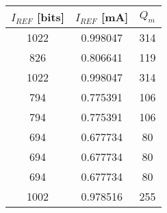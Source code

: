 \begin{tabular}{ccc}
\toprule
$I_{REF}$ [bits] & $I_{REF}$ [mA] & $Q_m$ \\
\midrule
            1022 &       0.998047 &   314 \\
             826 &       0.806641 &   119 \\
            1022 &       0.998047 &   314 \\
             794 &       0.775391 &   106 \\
             794 &       0.775391 &   106 \\
             694 &       0.677734 &    80 \\
             694 &       0.677734 &    80 \\
             694 &       0.677734 &    80 \\
            1002 &       0.978516 &   255 \\
\bottomrule
\end{tabular}
